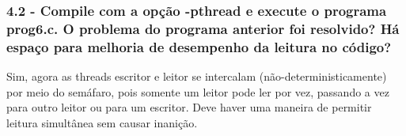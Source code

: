 \subsubsection{4.2 - Compile com a opção -pthread e execute o programa prog6.c. O problema do programa anterior foi resolvido? Há espaço para melhoria de desempenho da leitura no código?}

Sim, agora as threads escritor e leitor se intercalam (não-deterministicamente) por meio do semáfaro, pois somente um leitor pode ler por vez, passando a vez para outro leitor ou para um escritor. Deve haver uma maneira de permitir leitura simultânea sem causar inanição.

\vspace{2em}
\begin{minipage}{\textwidth}
    \hspace{-1em}
    \centering

\end{minipage}

